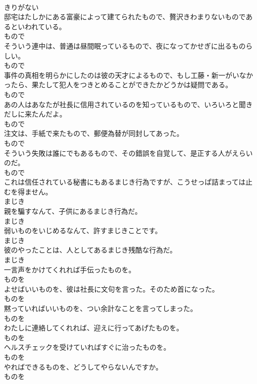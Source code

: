 \documentclass[8pt]{extreport}
\begin{document}
\begin{CJK}{UTF8}{min}
\\	きりがない
\\	邸宅はたしかにある富豪によって建てられたもので、贅沢きわまりないものであるといわれている。	
\\	もので
\\	そういう連中は、普通は昼間眠っているもので、夜になってかせぎに出るものらしい。	
\\	もので
\\	事件の真相を明らかにしたのは彼の天才によるもので、もし工藤・新一がいなかったら、果たして犯人をつきとめることができたかどうかは疑問である。	
\\	もので
\\	あの人はあなたが社長に信用されているのを知っているもので、いろいろと聞きだしに来たんだよ。	
\\	もので
\\	注文は、手紙で来たもので、郵便為替が同封してあった。	
\\	もので
\\	そういう失敗は誰にでもあるもので、その錯誤を自覚して、是正する人がえらいのだ。	
\\	もので
\\	これは信任されている秘書にもあるまじき行為ですが、こうせっぱ詰まっては止むを得ません。	
\\	まじき
\\	親を騙すなんて、子供にあるまじき行為だ。	
\\	まじき
\\	弱いものをいじめるなんて、許すまじきことです。	
\\	まじき
\\	彼のやったことは、人としてあるまじき残酷な行為だ。	
\\	まじき
\\	一言声をかけてくれれば手伝ったものを。	
\\	ものを
\\	よせばいいものを、彼は社長に文句を言った。そのため首になった。	
\\	ものを
\\	黙っていればいいものを、つい余計なことを言ってしまった。	
\\	ものを
\\	わたしに連絡してくれれば、迎えに行ってあげたものを。	
\\	ものを
\\	ヘルスチェックを受けていればすぐに治ったものを。	
\\	ものを
\\	やればできるものを、どうしてやらないんですか。	
\\	ものを

\end{CJK}
\end{document}
